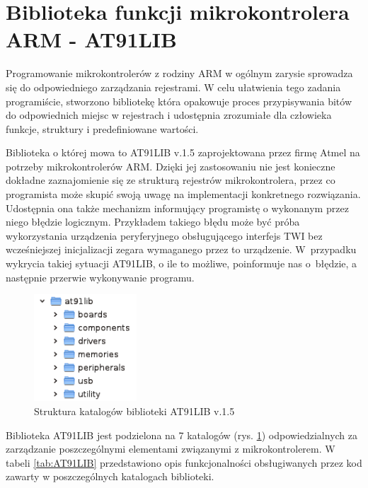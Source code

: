 \section{Biblioteka funkcji mikrokontrolera ARM - AT91LIB}
\label{sec:at91lib}
Programowanie mikrokontrolerów z rodziny ARM w ogólnym zarysie sprowadza się do
odpowiedniego zarządzania rejestrami.  W celu ułatwienia tego zadania
programiście, stworzono bibliotekę która opakowuje proces przypisywania bitów do
odpowiednich miejsc w rejestrach i udostępnia zrozumiałe dla człowieka funkcje,
struktury i predefiniowane wartości.

Biblioteka o której mowa to AT91LIB\cite{AT91LIB} v.1.5 zaprojektowana przez
firmę Atmel na potrzeby mikrokontrolerów ARM. Dzięki jej zastosowaniu nie jest
konieczne dokładne zaznajomienie się ze strukturą rejestrów mikrokontrolera,
przez co programista może skupić swoją uwagę na implementacji konkretnego
rozwiązania. Udostępnia ona także mechanizm informujący programistę o wykonanym
przez niego błędzie logicznym. Przykładem takiego błędu może być próba
wykorzystania urządzenia peryferyjnego obsługującego interfejs TWI bez
wcześniejszej inicjalizacji zegara wymaganego przez to urządzenie. W~przypadku
wykrycia takiej sytuacji AT91LIB, o ile to możliwe, poinformuje nas o~błędzie, a
następnie przerwie wykonywanie programu. 

\begin{figure}[!ht]
 \centering \includegraphics[height=40mm]{../images/ch05/at91lib_dirs.png}
 \caption{Struktura katalogów biblioteki AT91LIB v.1.5}
 \label{fig:AT91LIB}
\end{figure}

Biblioteka AT91LIB jest podzielona na 7 katalogów (rys. \ref{fig:AT91LIB})
odpowiedzialnych za zarządzanie poszczególnymi elementami związanymi z
mikrokontrolerem. W tabeli \ref{tab:AT91LIB} przedstawiono opis funkcjonalności
obsługiwanych przez kod zawarty w poszczególnych katalogach biblioteki. \newpage

